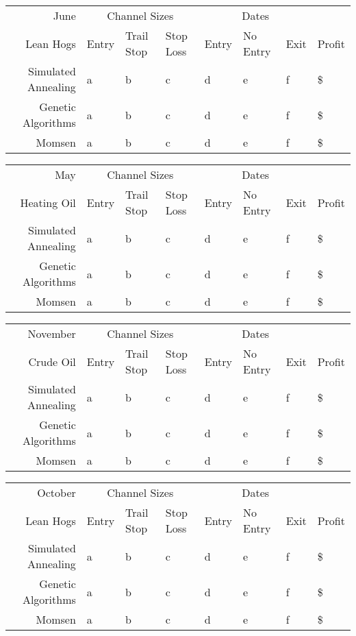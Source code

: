 \documentclass[10pt]{article}
\begin{document}
\begin{tabular}{|r|l|l|l|l|l|l|l|}
  \hline
  June & \multicolumn{3}{|c|}{Channel Sizes} & \multicolumn{3}{|c|}{Dates} &  \\
  Lean Hogs & Entry & Trail Stop & Stop Loss & Entry & No Entry & Exit & Profit\\ \hline
  Simulated Annealing & a & b & c & d & e & f & \$ \\ \hline
  Genetic Algorithms & a & b & c & d & e & f & \$ \\ \hline
  Momsen &  a & b & c & d & e & f & \$ \\ \hline
\end{tabular}

\begin{tabular}{|r|l|l|l|l|l|l|l|}
  \hline
  May & \multicolumn{3}{|c|}{Channel Sizes} & \multicolumn{3}{|c|}{Dates} &  \\
  Heating Oil & Entry & Trail Stop & Stop Loss & Entry & No Entry & Exit & Profit\\ \hline
  Simulated Annealing & a & b & c & d & e & f & \$ \\ \hline
  Genetic Algorithms & a & b & c & d & e & f & \$ \\ \hline
  Momsen &  a & b & c & d & e & f & \$ \\ \hline
\end{tabular}

\begin{tabular}{|r|l|l|l|l|l|l|l|}
  \hline
  November & \multicolumn{3}{|c|}{Channel Sizes} & \multicolumn{3}{|c|}{Dates} &  \\
  Crude Oil & Entry & Trail Stop & Stop Loss & Entry & No Entry & Exit & Profit\\ \hline
  Simulated Annealing & a & b & c & d & e & f & \$ \\ \hline
  Genetic Algorithms & a & b & c & d & e & f & \$ \\ \hline
  Momsen &  a & b & c & d & e & f & \$ \\ \hline
\end{tabular}

\begin{tabular}{|r|l|l|l|l|l|l|l|}
  \hline
  October & \multicolumn{3}{|c|}{Channel Sizes} & \multicolumn{3}{|c|}{Dates} &  \\
  Lean Hogs & Entry & Trail Stop & Stop Loss & Entry & No Entry & Exit & Profit\\ \hline
  Simulated Annealing & a & b & c & d & e & f & \$ \\ \hline
  Genetic Algorithms & a & b & c & d & e & f & \$ \\ \hline
  Momsen &  a & b & c & d & e & f & \$ \\ \hline
\end{tabular}
\end{document}
